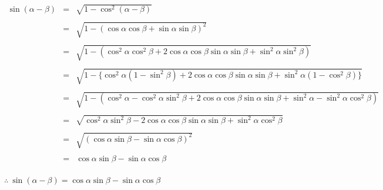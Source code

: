\documentclass[a4paper]{article}
\begin{document}
$
\begin{array}{rcl}
\sin(\alpha-\beta) & = & \sqrt{1-\cos^2(\alpha-\beta)} \\\\
& = & \sqrt{1-(\cos\alpha\cos\beta+\sin\alpha\sin\beta)^2} \\\\
& = & \sqrt{1-(\cos^2\alpha\cos^2\beta+2\cos\alpha\cos\beta\sin\alpha\sin\beta+\sin^2\alpha\sin^2\beta)} \\\\
& = & \sqrt{1-\{\cos^2\alpha(1-\sin^2\beta)+2\cos\alpha\cos\beta\sin\alpha\sin\beta+\sin^2\alpha(1-\cos^2\beta)\}} \\\\
& = & \sqrt{1-(\cos^2\alpha-\cos^2\alpha\sin^2\beta+2\cos\alpha\cos\beta\sin\alpha\sin\beta+\sin^2\alpha-\sin^2\alpha\cos^2\beta)} \\\\
& = & \sqrt{\cos^2\alpha\sin^2\beta-2\cos\alpha\cos\beta\sin\alpha\sin\beta+\sin^2\alpha\cos^2\beta} \\\\
& = & \sqrt{(\cos\alpha\sin\beta-\sin\alpha\cos\beta)^2} \\\\
& = & \cos\alpha\sin\beta-\sin\alpha\cos\beta
\end{array}	
$
\\\\

$
\therefore \ \sin(\alpha-\beta) = \cos\alpha\sin\beta-\sin\alpha\cos\beta
$
\end{document}
